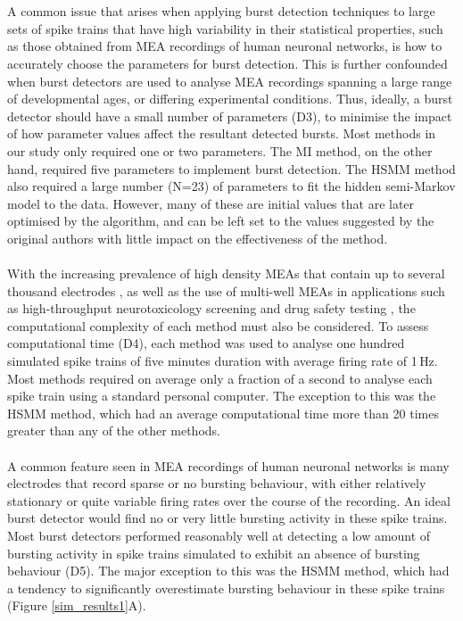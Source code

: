 \documentclass[12pt, titlepage]{article}
\begin{document}
	\\ \\ A common issue that arises when applying burst detection techniques to large sets of spike trains that have high variability in their statistical properties, such as those obtained from MEA recordings of human neuronal networks, is how to accurately choose the parameters for burst detection. This is further confounded when burst detectors are used to analyse MEA recordings spanning a large range of developmental ages, or differing experimental conditions. Thus, ideally, a burst detector should have a small number of parameters (D3), to minimise the impact of how parameter values affect the resultant detected bursts. Most methods in our study only required one or two parameters. The MI method, on the other hand, required five parameters to implement burst detection. The HSMM method also required a large number (N=23) of parameters to fit the hidden semi-Markov model to the data. However, many of these are initial values that are later optimised by the algorithm, and can be left set to the values suggested by the original authors with little impact on the effectiveness of the method. 
	\\ \\ With the increasing prevalence of high density MEAs that contain up to several thousand electrodes \cite{Maccione2014}, as well as the use of multi-well MEAs in applications such as high-throughput neurotoxicology screening \cite{Valdivia2014,Nicolas2014} and drug safety testing \cite{Gilchrist2015}, the computational complexity of each method must also be considered. To assess computational time (D4), each method was used to analyse one hundred simulated spike trains of five minutes duration with average firing rate of 1$\,$Hz. Most methods required on average only a fraction of a second to analyse each spike train using a standard personal computer. The exception to this was the HSMM method, which had an average computational time more than 20 times greater than any of the other methods. 
	\\ \\ A common feature seen in MEA recordings of human neuronal networks is many electrodes that record sparse or no bursting behaviour, with either relatively stationary or quite variable firing rates over the course of the recording. An ideal burst detector would find no or very little bursting activity in these spike trains. Most burst detectors performed reasonably well at detecting a low amount of bursting activity in spike trains simulated to exhibit an absence of bursting behaviour (D5). The major exception to this was the HSMM method, which had a tendency to significantly overestimate bursting behaviour in these spike trains (Figure \ref{sim_results1}A). 
\end{document}

